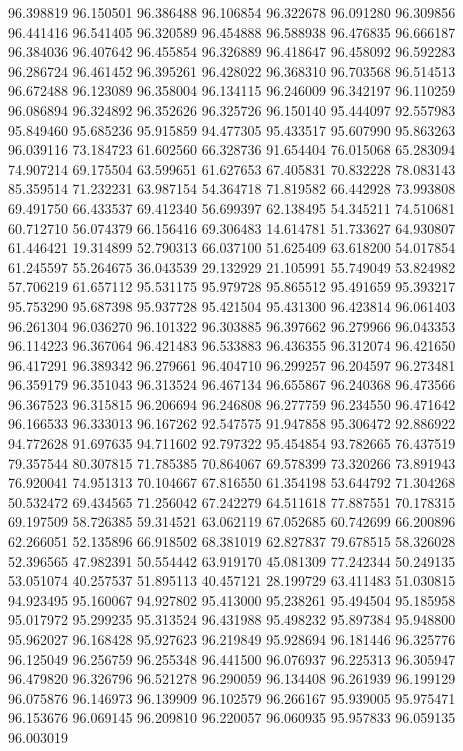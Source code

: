 96.398819
96.150501
96.386488
96.106854
96.322678
96.091280
96.309856
96.441416
96.541405
96.320589
96.454888
96.588938
96.476835
96.666187
96.384036
96.407642
96.455854
96.326889
96.418647
96.458092
96.592283
96.286724
96.461452
96.395261
96.428022
96.368310
96.703568
96.514513
96.672488
96.123089
96.358004
96.134115
96.246009
96.342197
96.110259
96.086894
96.324892
96.352626
96.325726
96.150140
95.444097
92.557983
95.849460
95.685236
95.915859
94.477305
95.433517
95.607990
95.863263
96.039116
73.184723
61.602560
66.328736
91.654404
76.015068
65.283094
74.907214
69.175504
63.599651
61.627653
67.405831
70.832228
78.083143
85.359514
71.232231
63.987154
54.364718
71.819582
66.442928
73.993808
69.491750
66.433537
69.412340
56.699397
62.138495
54.345211
74.510681
60.712710
56.074379
66.156416
69.306483
14.614781
51.733627
64.930807
61.446421
19.314899
52.790313
66.037100
51.625409
63.618200
54.017854
61.245597
55.264675
36.043539
29.132929
21.105991
55.749049
53.824982
57.706219
61.657112
95.531175
95.979728
95.865512
95.491659
95.393217
95.753290
95.687398
95.937728
95.421504
95.431300
96.423814
96.061403
96.261304
96.036270
96.101322
96.303885
96.397662
96.279966
96.043353
96.114223
96.367064
96.421483
96.533883
96.436355
96.312074
96.421650
96.417291
96.389342
96.279661
96.404710
96.299257
96.204597
96.273481
96.359179
96.351043
96.313524
96.467134
96.655867
96.240368
96.473566
96.367523
96.315815
96.206694
96.246808
96.277759
96.234550
96.471642
96.166533
96.333013
96.167262
92.547575
91.947858
95.306472
92.886922
94.772628
91.697635
94.711602
92.797322
95.454854
93.782665
76.437519
79.357544
80.307815
71.785385
70.864067
69.578399
73.320266
73.891943
76.920041
74.951313
70.104667
67.816550
61.354198
53.644792
71.304268
50.532472
69.434565
71.256042
67.242279
64.511618
77.887551
70.178315
69.197509
58.726385
59.314521
63.062119
67.052685
60.742699
66.200896
62.266051
52.135896
66.918502
68.381019
62.827837
79.678515
58.326028
52.396565
47.982391
50.554442
63.919170
45.081309
77.242344
50.249135
53.051074
40.257537
51.895113
40.457121
28.199729
63.411483
51.030815
94.923495
95.160067
94.927802
95.413000
95.238261
95.494504
95.185958
95.017972
95.299235
95.313524
96.431988
95.498232
95.897384
95.948800
95.962027
96.168428
95.927623
96.219849
95.928694
96.181446
96.325776
96.125049
96.256759
96.255348
96.441500
96.076937
96.225313
96.305947
96.479820
96.326796
96.521278
96.290059
96.134408
96.261939
96.199129
96.075876
96.146973
96.139909
96.102579
96.266167
95.939005
95.975471
96.153676
96.069145
96.209810
96.220057
96.060935
95.957833
96.059135
96.003019

